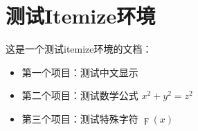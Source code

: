 \documentclass{article}
\begin{document}
\section{测试Itemize环境}

这是一个测试itemize环境的文档：

\begin{itemize}
    \item 第一个项目：测试中文显示
    \item 第二个项目：测试数学公式 $x^2 + y^2 = z^2$
    \item 第三个项目：测试特殊字符 $\digamma(x)$
\end{itemize}
\end{document}

